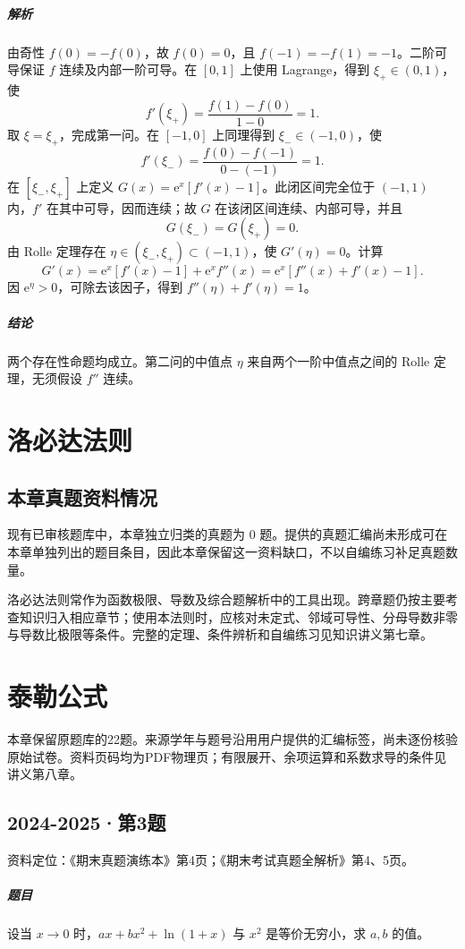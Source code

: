 \documentclass[UTF8,fontset=fandol,12pt,oneside,openany]{ctexrep}
\newcommand{\ee}{\mathrm e}
\theoremstyle{definition}
\begin{document}
\paragraph{解析}
由奇性 $f(0)=-f(0)$，故 $f(0)=0$，且 $f(-1)=-f(1)=-1$。二阶可导保证 $f$ 连续及内部一阶可导。在 $[0,1]$ 上使用 Lagrange，得到 $\xi_+\in(0,1)$，使
\[
f'(\xi_+)=\frac{f(1)-f(0)}{1-0}=1.
\]
取 $\xi=\xi_+$，完成第一问。在 $[-1,0]$ 上同理得到 $\xi_-\in(-1,0)$，使
\[
f'(\xi_-)=\frac{f(0)-f(-1)}{0-(-1)}=1.
\]
在 $[\xi_-,\xi_+]$ 上定义 $G(x)=\ee^x[f'(x)-1]$。此闭区间完全位于 $(-1,1)$ 内，$f'$ 在其中可导，因而连续；故 $G$ 在该闭区间连续、内部可导，并且
\[
G(\xi_-)=G(\xi_+)=0.
\]
由 Rolle 定理存在 $\eta\in(\xi_-,\xi_+)\subset(-1,1)$，使 $G'(\eta)=0$。计算
\[
G'(x)=\ee^x[f'(x)-1]+\ee^xf''(x)
=\ee^x[f''(x)+f'(x)-1].
\]
因 $\ee^\eta>0$，可除去该因子，得到 $f''(\eta)+f'(\eta)=1$。
\paragraph{结论}两个存在性命题均成立。第二问的中值点 $\eta$ 来自两个一阶中值点之间的 Rolle 定理，无须假设 $f''$ 连续。


\chapter{洛必达法则}
\label{exam:07:chapter}

\section{本章真题资料情况}

现有已审核题库中，本章独立归类的真题为 $0$ 题。提供的真题汇编尚未形成可在本章单独列出的题目条目，因此本章保留这一资料缺口，不以自编练习补足真题数量。

洛必达法则常作为函数极限、导数及综合题解析中的工具出现。跨章题仍按主要考查知识归入相应章节；使用本法则时，应核对未定式、邻域可导性、分母导数非零与导数比极限等条件。完整的定理、条件辨析和自编练习见知识讲义第七章。


\chapter{泰勒公式}
\label{exam:08:chapter}
本章保留原题库的22题。来源学年与题号沿用用户提供的汇编标签，尚未逐份核验原始试卷。资料页码均为PDF物理页；有限展开、余项运算和系数求导的条件见讲义第八章。

\par\addvspace{18pt}\noindent\begin{minipage}{\linewidth}
\section{2024-2025·第3题}
\label{exam:08:q1}
资料定位：《期末真题演练本》第4页；《期末考试真题全解析》第4、5页。
\paragraph{题目}
设当 $x\to0$ 时，$ax+bx^2+\ln(1+x)$ 与 $x^2$ 是等价无穷小，求 $a,b$ 的值。
\end{minipage}\par
\end{document}
